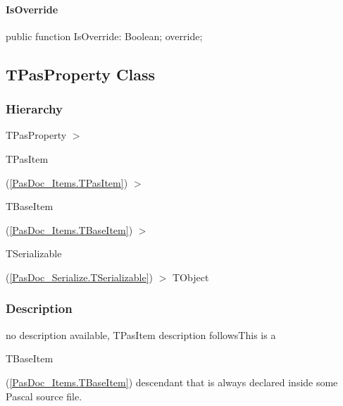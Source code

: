 \documentclass{report}
\newif\ifpdf
\begin{document}
\paragraph*{IsOverride}\hspace*{\fill}

\label{PasDoc_Items.TPasRoutine-IsOverride}
\begin{list}{}{
\setlength{\itemindent}{0cm}
\setlength{\listparindent}{0cm}
\setlength{\leftmargin}{\evensidemargin}
\addtolength{\leftmargin}{\tmplength}
\settowidth{\labelsep}{X}
\addtolength{\leftmargin}{\labelsep}
\setlength{\labelwidth}{\tmplength}
}
\item[\textbf{Declaration}\hfill]
\ifpdf
\begin{flushleft}
\fi
\begin{ttfamily}
public function IsOverride: Boolean; override;\end{ttfamily}

\ifpdf
\end{flushleft}
\fi

\end{list}
\ifpdf
\subsection*{\large{\textbf{TPasProperty Class}}\normalsize\hspace{1ex}\hrulefill}
\else
\subsection*{TPasProperty Class}
\fi
\label{PasDoc_Items.TPasProperty}
\subsubsection*{\large{\textbf{Hierarchy}}\normalsize\hspace{1ex}\hfill}
TPasProperty {$>$} \begin{ttfamily}TPasItem\end{ttfamily}(\ref{PasDoc_Items.TPasItem}) {$>$} \begin{ttfamily}TBaseItem\end{ttfamily}(\ref{PasDoc_Items.TBaseItem}) {$>$} \begin{ttfamily}TSerializable\end{ttfamily}(\ref{PasDoc_Serialize.TSerializable}) {$>$} 
TObject
\subsubsection*{\large{\textbf{Description}}\normalsize\hspace{1ex}\hfill}
no description available, TPasItem description followsThis is a \begin{ttfamily}TBaseItem\end{ttfamily}(\ref{PasDoc_Items.TBaseItem}) descendant that is always declared inside some Pascal source file.
\end{document}
